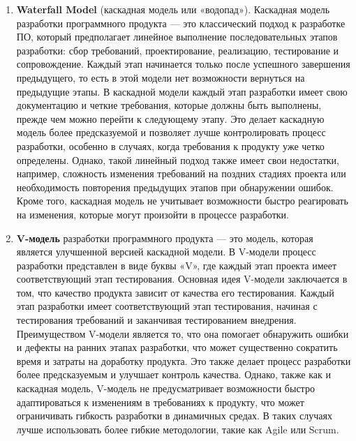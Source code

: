\begin{enumerate}
	\item \textbf{Waterfall Model} (каскадная модель или «водопад»). Каскадная модель разработки программного продукта — это классический подход к разработке ПО, который предполагает линейное выполнение последовательных этапов разработки: сбор требований, проектирование, реализацию, тестирование и сопровождение. Каждый этап начинается только после успешного завершения предыдущего, то есть в этой модели нет возможности вернуться на предыдущие этапы.
	В каскадной модели каждый этап разработки имеет свою документацию и четкие требования, которые должны быть выполнены, прежде чем можно перейти к следующему этапу. Это делает каскадную модель более предсказуемой и позволяет лучше контролировать процесс разработки, особенно в случаях, когда требования к продукту уже четко определены.
	Однако, такой линейный подход также имеет свои недостатки, например, сложность изменения требований на поздних стадиях проекта или необходимость повторения предыдущих этапов при обнаружении ошибок. Кроме того, каскадная модель не учитывает возможности быстро реагировать
	на изменения, которые могут произойти в процессе разработки.
	
	\item \textbf{V-модель} разработки программного продукта — это модель, которая является улучшенной версией каскадной модели. В V-модели процесс разработки представлен в виде буквы «V», где каждый этап проекта имеет соответствующий этап тестирования. Основная идея V-модели заключается в том, что качество продукта зависит от качества его тестирования. Каждый этап разработки имеет соответствующий этап тестирования, начиная с тестирования требований и заканчивая тестированием внедрения. Преимуществом V-модели является то, что она помогает обнаружить ошибки и дефекты на ранних этапах разработки, что может существенно сократить время и затраты на доработку продукта. Это также делает процесс разработки более предсказуемым и улучшает контроль качества. Однако, также как и каскадная модель, V-модель не предусматривает возможности быстро адаптироваться к изменениям в требованиях к продукту, что может ограничивать гибкость разработки в динамичных средах. В таких случаях лучше использовать более гибкие методологии, такие как Agile или Scrum.
	

\end{enumerate}
